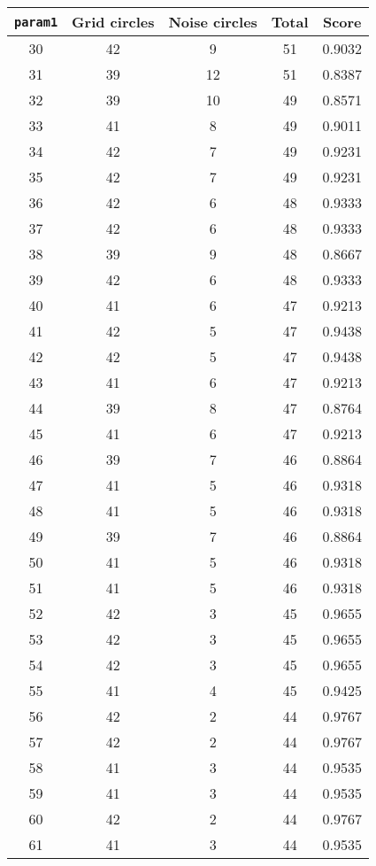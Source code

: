 \documentclass[letterpaper, 12pt]{article}
\begin{document}
\begin{longtable}{|c|c|c|c|c|}
\hline
\textbf{\texttt{param1}} & \textbf{Grid circles} & \textbf{Noise circles} & \textbf{Total} & \textbf{Score} \\
\hline
30 & 42 & 9 & 51 & 0.9032 \\
\hline
31 & 39 & 12 & 51 & 0.8387 \\
\hline
32 & 39 & 10 & 49 & 0.8571 \\
\hline
33 & 41 & 8 & 49 & 0.9011 \\
\hline
34 & 42 & 7 & 49 & 0.9231 \\
\hline
35 & 42 & 7 & 49 & 0.9231 \\
\hline
36 & 42 & 6 & 48 & 0.9333 \\
\hline
37 & 42 & 6 & 48 & 0.9333 \\
\hline
38 & 39 & 9 & 48 & 0.8667 \\
\hline
39 & 42 & 6 & 48 & 0.9333 \\
\hline
40 & 41 & 6 & 47 & 0.9213 \\
\hline
41 & 42 & 5 & 47 & 0.9438 \\
\hline
42 & 42 & 5 & 47 & 0.9438 \\
\hline
43 & 41 & 6 & 47 & 0.9213 \\
\hline
44 & 39 & 8 & 47 & 0.8764 \\
\hline
45 & 41 & 6 & 47 & 0.9213 \\
\hline
46 & 39 & 7 & 46 & 0.8864 \\
\hline
47 & 41 & 5 & 46 & 0.9318 \\
\hline
48 & 41 & 5 & 46 & 0.9318 \\
\hline
49 & 39 & 7 & 46 & 0.8864 \\
\hline
50 & 41 & 5 & 46 & 0.9318 \\
\hline
51 & 41 & 5 & 46 & 0.9318 \\
\hline
52 & 42 & 3 & 45 & 0.9655 \\
\hline
53 & 42 & 3 & 45 & 0.9655 \\
\hline
54 & 42 & 3 & 45 & 0.9655 \\
\hline
55 & 41 & 4 & 45 & 0.9425 \\
\hline
56 & 42 & 2 & 44 & 0.9767 \\
\hline
57 & 42 & 2 & 44 & 0.9767 \\
\hline
58 & 41 & 3 & 44 & 0.9535 \\
\hline
59 & 41 & 3 & 44 & 0.9535 \\
\hline
60 & 42 & 2 & 44 & 0.9767 \\
\hline
61 & 41 & 3 & 44 & 0.9535 \\

\end{longtable}
\end{document}
